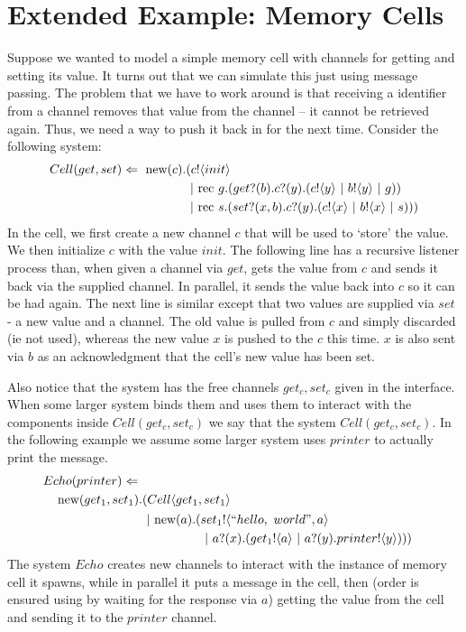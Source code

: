 \section{Extended Example: Memory Cells}
	Suppose we wanted to model a simple memory cell with channels for getting and setting its value.  
It turns out that we can simulate this just using message passing.  
The problem that we have to work around is that receiving a identifier from a channel removes that value from the channel -- it cannot be retrieved again.  
Thus, we need a way to push it back in for the next time.  
Consider the following system:
	\begin{equation}\begin{split}
		Cell(get,set) \Leftarrow\  \text{new}({c}). & ({c}!\langle{init}\rangle \\
		& \ |\ \text{rec }{g}.({get}?({b}).{c}?({y}).({c}!\langle{y}\rangle\ |\  {b}!\langle{y}\rangle\ |\  g))\\
		&\ |\ \text{rec }{s}.({set}?({x,b}).{c}?({y}).({c}!\langle{x}\rangle\ |\ {b}!\langle{x}\rangle\ |\  s)))
	\end{split}\end{equation}
	In the cell, we first create a new channel $c$ that will be used to `store' the value.  
We then initialize $c$ with the value $init$.  
The following line has a recursive listener process than, when given a channel via $get$, gets the value from $c$ and sends it back via the supplied channel.  
In parallel, it sends the value back into $c$ so it can be had again.  
The next line is similar except that two values are supplied via $set$ - a new value and a channel.  
The old value is pulled from $c$ and simply discarded (ie not used), whereas the new value $x$ is pushed to the $c$ this time.  
$x$ is also sent via $b$ as an acknowledgment that the cell's new value has been set.
	
	Also notice that the system has the free channels $get_c,set_c$ given in the interface. 
When some larger system binds them and uses them to interact with the components inside $Cell(get_c,set_c)$ we say that the system  $Cell(get_c,set_c)$.  
In the following example we assume some larger system uses $printer$ to actually print the message.
	\begin{equation}\begin{split}
		Echo(printer) \pdef\\
		\new{get_1,set_1} & (Cell\langle get_1,set_1\rangle\\
		&\begin{split}\comp \new{a}(&\send{set_1}{``hello,\ world",a}\\
		&\comp \receive{a}{x}(\send{get_1}{a}\comp \receive{a}{y}\send{printer}{y})))\end{split}
	\end{split}\end{equation}
	The system $Echo$ creates new channels to interact with the instance of memory cell it spawns, while in parallel it puts a message in the cell, then (order is ensured using by waiting for the response via $a$) getting the value from the cell and sending it to the $printer$ channel.
	
